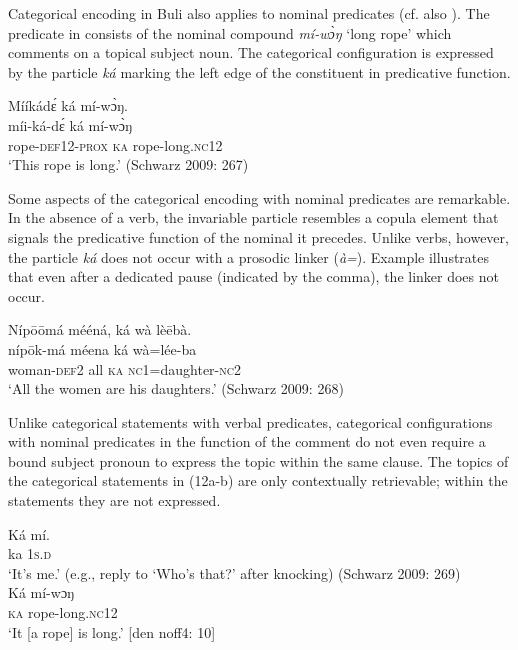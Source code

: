 \documentclass[output=paper]{langsci/langscibook}
\begin{document}
Categorical encoding in Buli also applies to nominal predicates (cf. also \citealt{Schwarz2009}). The predicate in  consists of the nominal compound \textit{mí-w\`ɔŋ} ‘long rope’ which comments on a topical subject noun. The categorical configuration is expressed by the particle \textit{ká} marking the left edge of the constituent in predicative function. 

\ea\label{ex:schwarz:10}
\glll  Mííkád\'ɛ    ká  mí-w\`{ɔ}ŋ.\\
  míi-ká-d\'ɛ    ká  mí-w\`{ɔ}ŋ\\
       rope-\textsc{def}12-\textsc{prox}  \textsc{ka}  rope-long.\textsc{nc}12\\
\glt ‘This rope is long.’ (Schwarz 2009: 267)
\z

Some aspects of the categorical encoding with nominal predicates are remarkable. In the absence of a verb, the invariable particle resembles a copula element that signals the predicative function of the nominal it precedes. Unlike verbs, however, the particle \textit{ká} does not occur with a prosodic linker (\textit{à=}). Example  illustrates that even after a dedicated pause (indicated by the comma), the linker does not occur.

\ea\label{ex:schwarz:11}
\glll   \textup{Níp}\={o}\={o}má  mééná,    ká  {wà  lè\={e}bà.}\\
    níp\={o}k-má  méena    ká  wà=lée-ba\\
   woman-\textsc{def}2  all    \textsc{ka}  \textsc{nc}1=daughter-\textsc{nc}2\\
\glt ‘All the women are his daughters.’ (Schwarz 2009: 268)
\z

Unlike categorical statements with verbal predicates, categorical configurations with nominal predicates in the function of the comment do not even require a bound subject pronoun to express the topic within the same clause. The topics of the categorical statements in (12a-b) are only contextually retrievable; within the statements they are not expressed.     


\begin{exe}
	\ex\label{ex:schwarz:12a}\begin{xlist}
		\ex  \gll Ká  mí. \\
			ka  1\textsc{s.d}\\
\glt   ‘It’s me.’ (e.g., reply to ‘Who’s that?’ after knocking) (Schwarz 2009: 269)
{ } \\
		\ex\gll  Ká  mí-wɔŋ\\
			\textsc{ka}  rope-long.\textsc{nc}12\\
    \glt ‘It [a rope] is long.’ [den noff4: 10]
	\end{xlist}
\end{exe}
\end{document}

